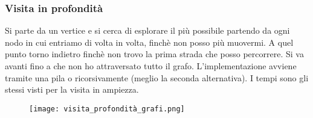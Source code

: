 \subsubsection{Visita in profondità}
Si parte da un vertice e si cerca di esplorare il più possibile partendo da ogni 
nodo in cui entriamo di volta in volta, finchè non posso più muovermi. A quel punto 
torno indietro finchè non trovo la prima strada che posso percorrere. Si va avanti fino a che 
non ho attraversato tutto il grafo. L'implementazione avviene tramite una pila o ricorsivamente (meglio la seconda alternativa).
I tempi sono gli stessi visti per la visita in ampiezza.
\begin{figure}[h]
    \texttt{[image: visita\_profondità\_grafi.png]}
\end{figure}

\clearpage

